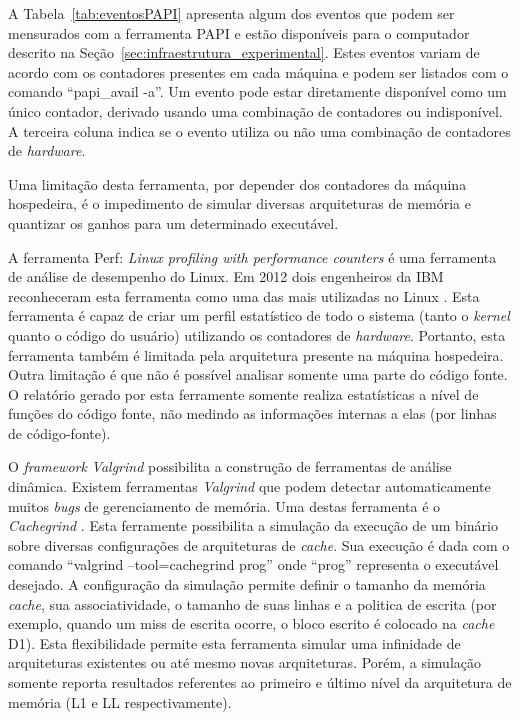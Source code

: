 A Tabela~\ref{tab:eventosPAPI} apresenta algum dos eventos que podem ser mensurados com a ferramenta PAPI e estão disponíveis para o computador descrito na Seção~\ref{sec:infraestrutura_experimental}.
Estes eventos variam de acordo com os contadores presentes em cada máquina e podem ser listados com o comando ``papi\_avail -a''.
Um evento pode estar diretamente disponível como um único contador, derivado usando uma combinação de contadores ou indisponível.
A terceira coluna indica se o evento utiliza ou não uma combinação de contadores de \textit{hardware}.



Uma limitação desta ferramenta, por depender dos contadores da máquina hospedeira, é o impedimento de simular diversas arquiteturas de memória e quantizar os ganhos para um determinado executável.


A ferramenta Perf: \textit{Linux profiling with performance counters} \cite{perf} é uma ferramenta de análise de desempenho do Linux. 
Em 2012 dois engenheiros da IBM reconheceram esta ferramenta como uma das mais utilizadas no Linux \cite{perfIBM}.
Esta ferramenta é capaz de criar um perfil estatístico de todo o sistema (tanto o \textit{kernel} quanto o código do usuário) utilizando os contadores de \textit{hardware}. Portanto, esta ferramenta também é limitada pela arquitetura presente na máquina hospedeira.
Outra limitação é que não é possível analisar somente uma parte do código fonte.
O relatório gerado por esta ferramente somente realiza estatísticas a nível de funções do código fonte, não medindo as informações internas a elas (por linhas de código-fonte).


O \textit{framework} \textit{Valgrind} \cite{valgrind} possibilita a construção de ferramentas de análise dinâmica.
Existem ferramentas \textit{Valgrind} que podem detectar automaticamente muitos \textit{bugs} de gerenciamento de memória.
Uma destas ferramenta é o \textit{Cachegrind} \cite{cachegrind}.
Esta ferramente possibilita a simulação da execução de um binário sobre diversas configurações de arquiteturas de \textit{cache}.
Sua execução é dada com o comando ``valgrind --tool=cachegrind prog'' onde ``prog'' representa o executável desejado.
A configuração da simulação permite definir o tamanho da memória \textit{cache}, sua associatividade, o tamanho de suas linhas e a politica de escrita (por exemplo, quando um miss de escrita ocorre, o bloco escrito é colocado na \textit{cache} D1).
Esta flexibilidade permite esta ferramenta simular uma infinidade de arquiteturas existentes ou até mesmo novas arquiteturas.
Porém, a simulação somente reporta resultados referentes ao primeiro e último nível da arquitetura de memória (L1 e LL respectivamente).


